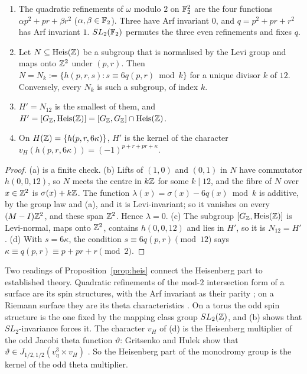 \begin{proposition}\label{prop:heis}
\begin{enumerate}[label=(\alph*)]
\item The quadratic refinements of $\omega$ modulo $2$ on $\mathbb{F}_2^2$ are the four functions $\alpha p^2+pr+\beta r^2$ ($\alpha,\beta\in\mathbb{F}_2$). Three have Arf invariant $0$, and $q=p^2+pr+r^2$ has Arf invariant $1$. $SL_2(\mathbb{F}_2)$ permutes the three even refinements and fixes $q$.
\item Let $N\subseteq\mathrm{Heis}(\mathbb{Z})$ be a subgroup that is normalised by the Levi group and maps onto $\mathbb{Z}^2$ under $(p,r)$. Then $N=N_k:=\{h(p,r,s):s\equiv6q(p,r)\bmod k\}$ for a unique divisor $k$ of $12$. Conversely, every $N_k$ is such a subgroup, of index $k$.
\item $H'=N_{12}$ is the smallest of them, and $H'=[G_{\mathbb{Z}},\mathrm{Heis}(\mathbb{Z})]=[G_{\mathbb{Z}},G_{\mathbb{Z}}]\cap\mathrm{Heis}(\mathbb{Z})$.
\item On $H(\mathbb{Z})=\{h(p,r,6\kappa)\}$, $H'$ is the kernel of the character $v_H(h(p,r,6\kappa))=(-1)^{p+r+pr+\kappa}$.
\end{enumerate}
\end{proposition}
\begin{proof}
(a) is a finite check. (b) Lifts of $(1,0)$ and $(0,1)$ in $N$ have commutator $h(0,0,12)$, so $N$ meets the centre in $k\mathbb{Z}$ for some $k\mid12$, and the fibre of $N$ over $x\in\mathbb{Z}^2$ is $\sigma(x)+k\mathbb{Z}$. The function $\lambda(x)=\sigma(x)-6q(x)\bmod k$ is additive, by the group law and (a), and it is Levi-invariant; so it vanishes on every $(M-I)\mathbb{Z}^2$, and these span $\mathbb{Z}^2$. Hence $\lambda=0$. (c) The subgroup $[G_{\mathbb{Z}},\mathrm{Heis}(\mathbb{Z})]$ is Levi-normal, maps onto $\mathbb{Z}^2$, contains $h(0,0,12)$ and lies in $H'$, so it is $N_{12}=H'$. (d) With $s=6\kappa$, the condition $s\equiv6q(p,r)\pmod{12}$ says $\kappa\equiv q(p,r)\equiv p+pr+r\pmod2$.
\end{proof}

Two readings of Proposition~\ref{prop:heis} connect the Heisenberg part to established theory. Quadratic refinements of the mod-$2$ intersection form of a surface are its spin structures, with the Arf invariant as their parity \cite{Johnson}; on a Riemann surface they are its theta characteristics \cite{AtiyahSpin}. On a torus the odd spin structure is the one fixed by the mapping class group $SL_2(\mathbb{Z})$, and (b) shows that $SL_2$-invariance forces it. The character $v_H$ of (d) is the Heisenberg multiplier of the odd Jacobi theta function $\vartheta$: Gritsenko and Hulek show that $\vartheta\in J_{1/2,1/2}(v_\eta^3\times v_H)$ \cite[(1.4)--(1.5)]{GritsenkoHulek}. So the Heisenberg part of the monodromy group is the kernel of the odd theta multiplier.

